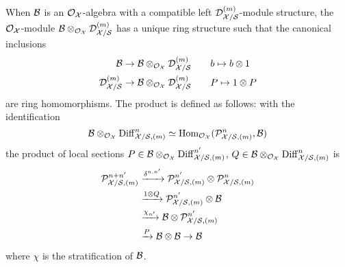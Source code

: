 \documentclass{article}
\theoremstyle{change}
\numberwithin{equation}{subsubsection}
\begin{document}
When ${\cal B}$ is an ${\cal O}_{\cal X}$-algebra with a compatible left
${{\cal D}}^{({m})}_{{\cal X}/{\cal S}}$-module structure, the ${\cal O}_{\cal X}$-module
${\cal B}\otimes_{{\cal O}_{\cal X}}{{\cal D}}^{({m})}_{{\cal X}/{\cal S}}$ has a unique ring structure
such that the canonical inclusions
\begin{align*}
  {\cal B}\to{\cal B}\otimes_{{\cal O}_{\cal X}}{{\cal D}}^{({m})}_{{\cal X}/{\cal S}}\qquad &b\mapsto b\otimes1\\
  {{\cal D}}^{({m})}_{{\cal X}/{\cal S}}\to{\cal B}\otimes_{{\cal O}_{\cal X}}{{\cal D}}^{({m})}_{{\cal X}/{\cal S}}
  \qquad&P\mapsto 1\otimes P\\
\end{align*}
are ring homomorphisms. The product is defined as follows: with the
identification
\begin{equation}
  \label{eq:DmB/s-mult1}
  {\cal B}\otimes_{{\cal O}_{\cal X}}{\operatorname{Diff}}^n_{{\cal X}/{\cal S},(m)}
  \simeq{\operatorname{Hom}}_{{\cal O}_{\cal X}}({\cal P}^n_{{\cal X}/{\cal S},(m)},{\cal B})
\end{equation}
the product of local sections
$P\in{\cal B}\otimes_{{\cal O}_{\cal X}}{\operatorname{Diff}}^{n'}_{{\cal X}/{\cal S},(m)}$,
$Q\in{\cal B}\otimes_{{\cal O}_{\cal X}}{\operatorname{Diff}}^n_{{\cal X}/{\cal S},(m)}$ is
\begin{equation}
  \label{eq:DmB/s-mult2}
  \begin{split}
    {\cal P}^{n+n'}_{{\cal X}/{\cal S},(m)}
    &\xrightarrow{\delta^{n,n'}}{\cal P}^{n'}_{{\cal X}/{\cal S},(m)}\otimes{\cal P}^n_{{\cal X}/{\cal S},(m)}\\
    &\xrightarrow{1\otimes Q}{\cal P}^{n'}_{{\cal X}/{\cal S},(m)}\otimes{\cal B}\\
    &\xrightarrow{\chi_{n'}}{\cal B}\otimes{\cal P}^{n'}_{{\cal X}/{\cal S},(m)}\\
    &\xrightarrow{P}{\cal B}\otimes{\cal B}\to{\cal B}
  \end{split}
\end{equation}
where $\chi$ is the stratification of ${\cal B}$.
\end{document}

